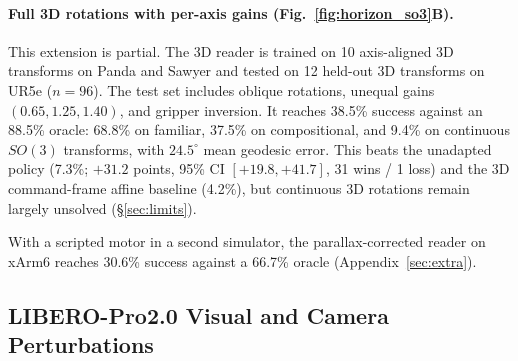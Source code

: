 \documentclass{article}
\theoremstyle{plain}
\theoremstyle{remark}
\begin{document}
\paragraph{Full 3D rotations with per-axis gains (Fig.~\ref{fig:horizon_so3}B).}
\label{sec:so3}
This extension is partial. The 3D reader is trained on 10 axis-aligned 3D transforms on Panda and Sawyer and tested on 12 held-out 3D transforms on UR5e ($n{=}96$). The test set includes oblique rotations, unequal gains $(0.65, 1.25, 1.40)$, and gripper inversion. It reaches 38.5\% success against an 88.5\% oracle: 68.8\% on familiar, 37.5\% on compositional, and 9.4\% on continuous $SO(3)$ transforms, with $24.5^\circ$ mean geodesic error. This beats the unadapted policy (7.3\%; $+31.2$ points, 95\% CI $[+19.8, +41.7]$, 31 wins / 1 loss) and the 3D command-frame affine baseline (4.2\%), but continuous 3D rotations remain largely unsolved (\S\ref{sec:limits}).

With a scripted motor in a second simulator, the parallax-corrected reader on xArm6 reaches 30.6\% success against a 66.7\% oracle (Appendix~\ref{sec:extra}).

\subsection{LIBERO-Pro2.0 Visual and Camera Perturbations}
\end{document}
